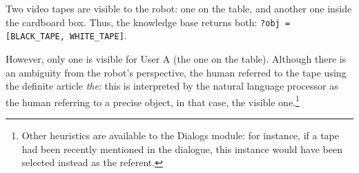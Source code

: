 \documentclass[preprint,3p,times]{elsarticle}
\newcommand{\concept}[1]{{\small \texttt{#1}}}
\newcommand{\stmt}[1]{{\footnotesize\tt$\langle$#1\relax$\rangle$}}
\newcommand{\ie}{i.e.\xspace}
\begin{document}
Two video tapes are visible to the robot: one on the table, and another one
inside the cardboard box. Thus, the knowledge base returns both: 
\concept{?obj = [BLACK\_TAPE, WHITE\_TAPE]}. 

However, only one is visible for User A (the one on the table). Although there is
an ambiguity from the robot's perspective, the human referred to the tape using
the definite article \emph{the}: this is interpreted by the natural language
processor as the human referring to a precise object, in that case, the visible
one.\footnote{Other heuristics are available to the {\sc Dialogs} module: for
instance, if a tape had been recently mentioned in the dialogue, this instance
would have been selected instead as the referent.}

%
\end{document}
